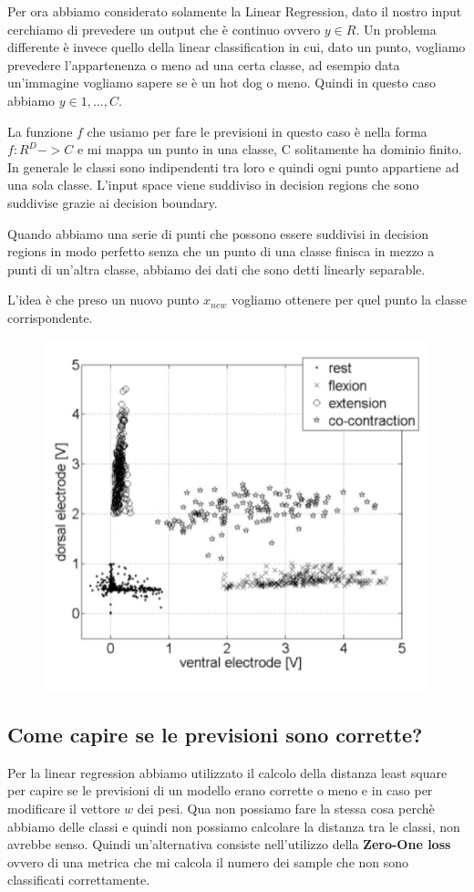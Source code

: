 \documentclass[14pt]{extreport}
\begin{document}
Per ora abbiamo considerato solamente la Linear Regression, dato il nostro input cerchiamo di prevedere un output che è continuo ovvero $y \in R$. Un
problema differente è invece quello della linear classification in cui, dato un punto, vogliamo prevedere l'appartenenza o meno ad una certa classe,
ad esempio data un'immagine vogliamo sapere se è un hot dog o meno. Quindi in questo caso abbiamo $y \in {1,...,C}$.

La funzione $f$ che usiamo per fare le previsioni in questo caso è nella forma $f:R^D->C$ e mi mappa un punto in una classe, C solitamente ha dominio
finito. In generale le classi sono indipendenti tra loro e quindi ogni punto appartiene ad una sola classe. L'input space viene suddiviso in decision
regions che sono suddivise grazie ai decision boundary.

Quando abbiamo una serie di punti che possono essere suddivisi in decision regions in modo perfetto senza che un punto di una classe finisca in mezzo
a punti di un'altra classe, abbiamo dei dati che sono detti linearly separable.

L'idea è che preso un nuovo punto $x_{new}$ vogliamo ottenere per quel punto la classe corrispondente.

\begin{figure}[H]
\centering
\includegraphics[width=0.4\linewidth]{141.jpeg}
\end{figure}

\subsection{Come capire se le previsioni sono corrette?}

Per la linear regression abbiamo utilizzato il calcolo della distanza least square per capire se le previsioni di un modello erano corrette o meno e
in caso per modificare il vettore $w$ dei pesi. Qua non possiamo fare la stessa cosa perchè abbiamo delle classi e quindi non possiamo calcolare la
distanza tra le classi, non avrebbe senso. Quindi un'alternativa consiste nell'utilizzo della \textbf{Zero-One loss} ovvero di una metrica che mi
calcola il numero dei sample che non sono classificati correttamente.
\end{document}
